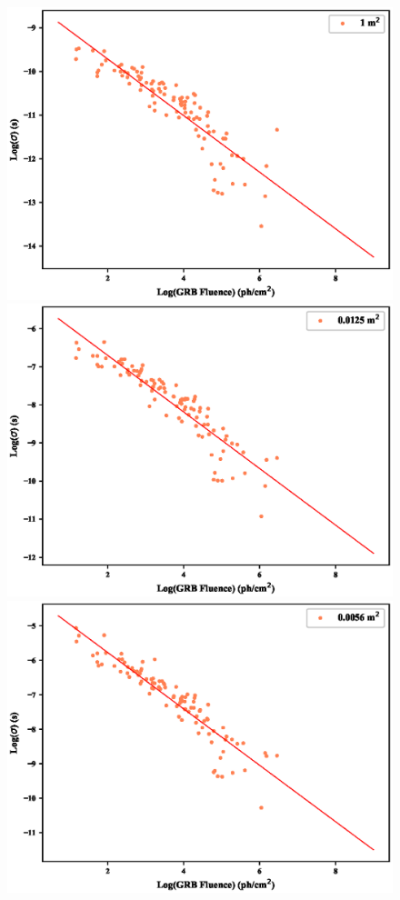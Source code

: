 \documentclass[]{spie}  %
\begin{document}
\begin{figure}[h!]
\includegraphics[scale=0.5,angle=0]{fig/LONG/sigma_vs_fluence_1.eps}\\
\includegraphics[scale=0.5,angle=0]{fig/LONG/sigma_vs_fluence_0.0125.eps}
\includegraphics[scale=0.5,angle=0]{fig/LONG/sigma_vs_fluence_0.0056.eps}\\


\end{figure}
\end{document}
